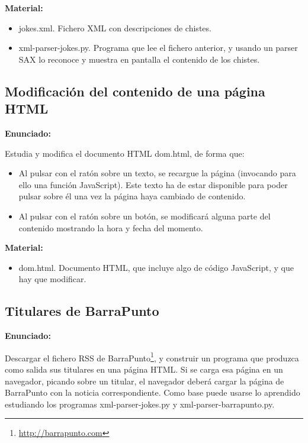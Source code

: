 \textbf{Material:}

\begin{itemize}
  \item jokes.xml. Fichero XML con descripciones de chistes.
  \item xml-parser-jokes.py. Programa que lee el fichero anterior, y usando un parser SAX lo reconoce y muestra en pantalla el contenido de los chistes.
\end{itemize}

\subsection{Modificación del contenido de una página HTML}
\label{subsec:xml-modificacion-html}

\textbf{Enunciado:}

Estudia y modifica el documento HTML dom.html, de forma que:

\begin{itemize}
\item Al pulsar con el ratón sobre un texto, se recargue la página (invocando para ello una función JavaScript). Este texto ha de estar disponible para poder pulsar sobre él una vez la página haya cambiado de contenido.
\item Al pulsar con el ratón sobre un botón, se modificará alguna parte del contenido mostrando la hora y fecha del momento.
\end{itemize}

\textbf{Material:}

\begin{itemize}
  \item dom.html. Documento HTML, que incluye algo de código JavaScript, y que hay que modificar.
\end{itemize}

\subsection{Titulares de BarraPunto}
\label{subsec:xml-barrapunto}

\textbf{Enunciado:}

Descargar el fichero RSS de BarraPunto\footnote{\url{http://barrapunto.com}}, y construir un programa que produzca como salida sus titulares en una página HTML. Si se carga esa página en un navegador,  picando sobre un titular, el navegador deberá cargar la página de BarraPunto con la noticia correspondiente. Como base puede usarse lo aprendido estudiando los programas xml-parser-jokes.py y xml-parser-barrapunto.py.

